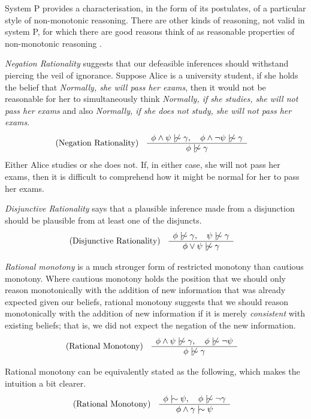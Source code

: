 System P provides a characterisation, in the form of its postulates, of a particular style of non-monotonic reasoning.
There are other kinds of reasoning, not valid in system P, for which there are good reasons think of as reasonable
properties of non-monotonic reasoning \cite{kraus1990nonmonotonic,lehmann1992what}.

\textit{Negation Rationality} suggests that our defeasible inferences should withstand piercing the veil of ignorance.
Suppose Alice is a university student, if she holds the belief that \textit{Normally, she will pass her exams}, then it would
not be reasonable for her to simultaneously think \textit{Normally, if she studies, she will not pass her exams} and
also \textit{Normally, if she does not study, she will not pass her exams}.
%
\begin{align}
	\inferLeft{Negation Rationality}{\phi \land \psi \ntwiddle \gamma, \quad \phi \land \neg \psi \ntwiddle \gamma}{\phi \ntwiddle \gamma}
\end{align}
Either Alice studies or she does not. If, in either case, she will not pass her exams, then it is difficult to
comprehend how it might be normal for her to pass her exams.

\textit{Disjunctive Rationality} says that a plausible inference made from a disjunction should be plausible from at least
one of the disjuncts.
\begin{align}
	\inferLeft{Disjunctive Rationality}{\phi \ntwiddle \gamma, \quad \psi \ntwiddle \gamma}{\phi \lor \psi \ntwiddle \gamma}
\end{align}

\textit{Rational monotony} is a much stronger form of restricted monotony than cautious monotony. Where cautious monotony
holds the position that we should only reason monotonically with the addition of new information that was already expected
given our beliefs, rational monotony suggests that we should reason monotonically with the addition of new information
if it is merely \textit{consistent} with existing beliefs; that is, we did not expect the negation of the new information.
\begin{align}
	\inferLeft{Rational Monotony}{\phi \land \psi \ntwiddle \gamma, \quad \phi \ntwiddle \neg \psi }{\phi \ntwiddle \gamma}
\end{align}

Rational monotony can be equivalently stated as the following, which makes the intuition a bit clearer.
\begin{align}
	\inferLeft{Rational Monotony}{\phi \twiddle \psi, \quad \phi \ntwiddle \neg \gamma}{\phi \land \gamma \twiddle \psi}
\end{align}

